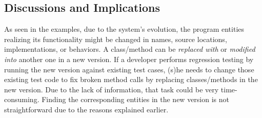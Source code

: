 
\subsection{Discussions and Implications}


As seen in the examples, due to the system's evolution, the program
entities realizing its functionality might be changed in names, source
locations, implementations, or behaviors. A class/method can be {\em
replaced with} or {\em modified into} another one in a new version. If
a developer performs regression testing by running the new version
against existing test cases, (s)he needs to change those existing test
code to fix broken method calls by replacing classes/methods in the
new version. Due to the lack of information, that task could be very
time-consuming. Finding the corresponding entities in the new version
is not straightforward due to the reasons explained earlier.




